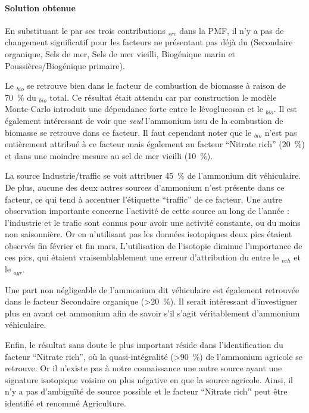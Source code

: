 \paragraph{Solution obtenue}%
\label{par:solution_obtenue}

En substituant le \NHq{} par ses trois contributions \NHq$_{src}$ dans la PMF, il n'y a pas
de changement significatif pour les facteurs ne présentant pas déjà du \NHq (Secondaire
organique, Sels de mer, Sels de mer vieilli, Biogénique marin et Poussières/Biogénique
primaire).

Le \NHq$_{bio}$ se retrouve bien dans le facteur de combustion de biomasse à raison de
\SI{70}{\percent} du \NHq$_{bio}$ total.
Ce résultat était attendu car par construction le modèle Monte-Carlo introduit une
dépendance forte entre le lévoglucosan et le \NHq$_{bio}$.
Il est également intéressant de voir que \textit{seul} l'ammonium issu de la combustion
de biomasse se retrouve dans ce facteur.
Il faut cependant noter que le \NHq$_{bio}$ n'est pas entièrement attribué à ce facteur
mais également au facteur ``Nitrate rich'' (\SI{20}{\percent}) et dans une moindre mesure au sel
de mer vieilli (\SI{10}{\percent}).

La source Industrie/traffic se voit attribuer \SI{45}{\percent} de l'ammonium dit véhiculaire.
De plus, aucune des deux autres sources d'ammonium n'est présente dans ce facteur, ce qui
tend à accentuer l'étiquette ``traffic'' de ce facteur.
Une autre observation importante concerne l'activité de cette source au long de l'année :
l'industrie et le trafic sont connus pour avoir une activité constante, ou du moins non
saisonnière.
Or en n'utilisant pas les données isotopiques deux pics étaient observés fin février et
fin mars.
L'utilisation de l'isotopie diminue l'importance de ces pics, qui étaient
vraisemblablement une erreur d'attribution du \NHq{} entre le \NHq$_{veh}$ et le
\NHq$_{agr}$.

Une part non négligeable de l'ammonium dit véhiculaire est également retrouvée dans le
facteur Secondaire organique (\SI{>20}{\percent}).
Il serait intéressant d'investiguer plus en avant cet ammonium afin de savoir s'il s'agit
véritablement d'ammonium véhiculaire.

Enfin, le résultat sans doute le plus important réside dans l'identification du facteur
``Nitrate rich'', où la quasi-intégralité (\SI{>90}{\percent}) de l'ammonium agricole se retrouve.
Or il n'existe pas à notre connaissance une autre source ayant une signature isotopique
voisine ou plus négative en \dN{} que la source agricole.
Ainsi, il n'y a pas d'ambiguïté de source possible et le facteur ``Nitrate rich''
peut être identifié et renommé Agriculture.

